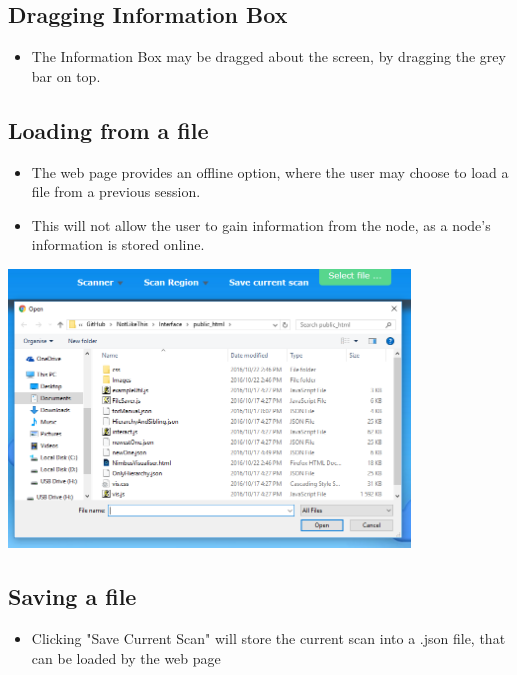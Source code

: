 \documentclass[hidelinks,a4paper,12pt]{article}
\begin{document}
		\subsection{Dragging Information Box}
				\begin {itemize}
				\item The Information Box may be dragged about the screen, by dragging the grey bar on top. 
			\end{itemize}
			
			\newpage	
			
			\subsection{Loading from a file}
					\begin {itemize}
					\item The web page provides an offline option, where the user may choose to load a file from a previous session. 
					\item This will not allow the user to gain information from the node, as a node's information is stored online.
				\end{itemize}
				
				\begin{center}
					\includegraphics[width=0.8\textwidth]{./images/OpenFile.png}
				\end{center}
			
				
				\subsection{Saving a file}
				\begin {itemize}
				\item Clicking "Save Current Scan" will store the current scan into a .json file, that can be loaded by the web page 
			\end{itemize}
			
\end{document}
